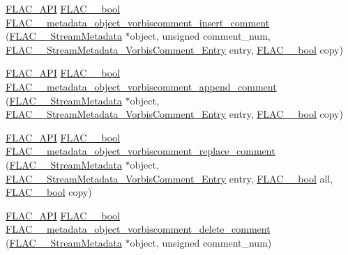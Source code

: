 \begin{DoxyCompactItemize}
\item 
\hyperlink{group__flac__export_ga56ca07df8a23310707732b1c0007d6f5}{F\+L\+A\+C\+\_\+\+A\+PI} \hyperlink{ordinals_8h_a95103469f1cbd78b8cf250194985b34e}{F\+L\+A\+C\+\_\+\+\_\+bool} \hyperlink{group__flac__metadata__object_ga0c23f59f465f302b35a2d3ab1eae07e7}{F\+L\+A\+C\+\_\+\+\_\+metadata\+\_\+object\+\_\+vorbiscomment\+\_\+insert\+\_\+comment} (\hyperlink{struct_f_l_a_c_____stream_metadata}{F\+L\+A\+C\+\_\+\+\_\+\+Stream\+Metadata} $\ast$object, unsigned comment\+\_\+num, \hyperlink{struct_f_l_a_c_____stream_metadata___vorbis_comment___entry}{F\+L\+A\+C\+\_\+\+\_\+\+Stream\+Metadata\+\_\+\+Vorbis\+Comment\+\_\+\+Entry} entry, \hyperlink{ordinals_8h_a95103469f1cbd78b8cf250194985b34e}{F\+L\+A\+C\+\_\+\+\_\+bool} copy)
\item 
\hyperlink{group__flac__export_ga56ca07df8a23310707732b1c0007d6f5}{F\+L\+A\+C\+\_\+\+A\+PI} \hyperlink{ordinals_8h_a95103469f1cbd78b8cf250194985b34e}{F\+L\+A\+C\+\_\+\+\_\+bool} \hyperlink{group__flac__metadata__object_gad04ef80ae5f852db8f3729a6ef8c1631}{F\+L\+A\+C\+\_\+\+\_\+metadata\+\_\+object\+\_\+vorbiscomment\+\_\+append\+\_\+comment} (\hyperlink{struct_f_l_a_c_____stream_metadata}{F\+L\+A\+C\+\_\+\+\_\+\+Stream\+Metadata} $\ast$object, \hyperlink{struct_f_l_a_c_____stream_metadata___vorbis_comment___entry}{F\+L\+A\+C\+\_\+\+\_\+\+Stream\+Metadata\+\_\+\+Vorbis\+Comment\+\_\+\+Entry} entry, \hyperlink{ordinals_8h_a95103469f1cbd78b8cf250194985b34e}{F\+L\+A\+C\+\_\+\+\_\+bool} copy)
\item 
\hyperlink{group__flac__export_ga56ca07df8a23310707732b1c0007d6f5}{F\+L\+A\+C\+\_\+\+A\+PI} \hyperlink{ordinals_8h_a95103469f1cbd78b8cf250194985b34e}{F\+L\+A\+C\+\_\+\+\_\+bool} \hyperlink{group__flac__metadata__object_gabef3625575b7e4c7257617a27220959a}{F\+L\+A\+C\+\_\+\+\_\+metadata\+\_\+object\+\_\+vorbiscomment\+\_\+replace\+\_\+comment} (\hyperlink{struct_f_l_a_c_____stream_metadata}{F\+L\+A\+C\+\_\+\+\_\+\+Stream\+Metadata} $\ast$object, \hyperlink{struct_f_l_a_c_____stream_metadata___vorbis_comment___entry}{F\+L\+A\+C\+\_\+\+\_\+\+Stream\+Metadata\+\_\+\+Vorbis\+Comment\+\_\+\+Entry} entry, \hyperlink{ordinals_8h_a95103469f1cbd78b8cf250194985b34e}{F\+L\+A\+C\+\_\+\+\_\+bool} all, \hyperlink{ordinals_8h_a95103469f1cbd78b8cf250194985b34e}{F\+L\+A\+C\+\_\+\+\_\+bool} copy)
\item 
\hyperlink{group__flac__export_ga56ca07df8a23310707732b1c0007d6f5}{F\+L\+A\+C\+\_\+\+A\+PI} \hyperlink{ordinals_8h_a95103469f1cbd78b8cf250194985b34e}{F\+L\+A\+C\+\_\+\+\_\+bool} \hyperlink{group__flac__metadata__object_ga2d1b309d4ca207039ad6d19bd779800f}{F\+L\+A\+C\+\_\+\+\_\+metadata\+\_\+object\+\_\+vorbiscomment\+\_\+delete\+\_\+comment} (\hyperlink{struct_f_l_a_c_____stream_metadata}{F\+L\+A\+C\+\_\+\+\_\+\+Stream\+Metadata} $\ast$object, unsigned comment\+\_\+num)

\end{DoxyCompactItemize}
